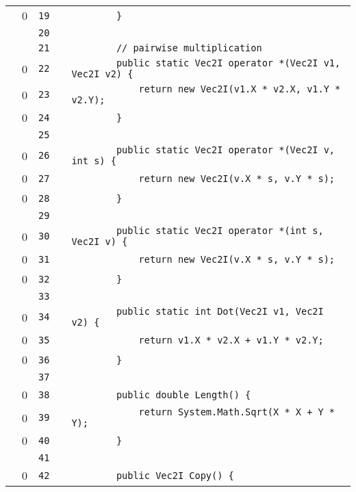 \documentclass[a4paper,landscape,10pt]{article}
\begin{document}
\begin{longtable}[l]{lrrll}
\cellcolor{red} & 0 & \verb~19~ & & \verb~        }~\\
\cellcolor{gray} &  & \verb~20~ & & \verb~~\\
\cellcolor{gray} &  & \verb~21~ & & \verb~        // pairwise multiplication~\\
\cellcolor{red} & 0 & \verb~22~ & & \verb~        public static Vec2I operator *(Vec2I v1, Vec2I v2) {~\\
\cellcolor{red} & 0 & \verb~23~ & & \verb~            return new Vec2I(v1.X * v2.X, v1.Y * v2.Y);~\\
\cellcolor{red} & 0 & \verb~24~ & & \verb~        }~\\
\cellcolor{gray} &  & \verb~25~ & & \verb~~\\
\cellcolor{red} & 0 & \verb~26~ & & \verb~        public static Vec2I operator *(Vec2I v, int s) {~\\
\cellcolor{red} & 0 & \verb~27~ & & \verb~            return new Vec2I(v.X * s, v.Y * s);~\\
\cellcolor{red} & 0 & \verb~28~ & & \verb~        }~\\
\cellcolor{gray} &  & \verb~29~ & & \verb~~\\
\cellcolor{red} & 0 & \verb~30~ & & \verb~        public static Vec2I operator *(int s, Vec2I v) {~\\
\cellcolor{red} & 0 & \verb~31~ & & \verb~            return new Vec2I(v.X * s, v.Y * s);~\\
\cellcolor{red} & 0 & \verb~32~ & & \verb~        }~\\
\cellcolor{gray} &  & \verb~33~ & & \verb~~\\
\cellcolor{red} & 0 & \verb~34~ & & \verb~        public static int Dot(Vec2I v1, Vec2I v2) {~\\
\cellcolor{red} & 0 & \verb~35~ & & \verb~            return v1.X * v2.X + v1.Y * v2.Y;~\\
\cellcolor{red} & 0 & \verb~36~ & & \verb~        }~\\
\cellcolor{gray} &  & \verb~37~ & & \verb~~\\
\cellcolor{red} & 0 & \verb~38~ & & \verb~        public double Length() {~\\
\cellcolor{red} & 0 & \verb~39~ & & \verb~            return System.Math.Sqrt(X * X + Y * Y);~\\
\cellcolor{red} & 0 & \verb~40~ & & \verb~        }~\\
\cellcolor{gray} &  & \verb~41~ & & \verb~~\\
\cellcolor{red} & 0 & \verb~42~ & & \verb~        public Vec2I Copy() {~\\

\end{longtable}
\end{document}
